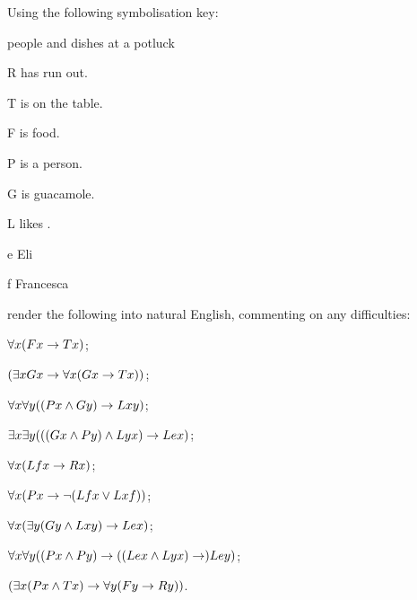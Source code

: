 \problempart
Using the following symbolisation key:
\begin{ekey}
\item[\domain] people and dishes at a potluck
\item[R]  has run out.
\item[T]  is on the table.
\item[F]  is food.
\item[P]  is a person.
\item[G]  is guacamole.
\item[L]  likes .
\item[e] Eli
\item[f] Francesca
\end{ekey}
render the following into natural English, commenting on any difficulties:
\begin{earg}
\item $\forall x (Fx \rightarrow Tx)$; %
\item $(\exists x Gx \rightarrow \forall x (Gx \rightarrow Tx))$; %
\item $\forall x \forall y ((Px \wedge Gy)\rightarrow Lxy)$; %
\item $\exists x \exists y (((Gx\wedge Py) \wedge Lyx) \rightarrow Lex)$; %
\item $\forall x(Lfx \rightarrow Rx) $; %
\item $\forall x (Px \to \neg (Lfx \vee Lxf))$; %
\item $\forall x (\exists y (Gy \wedge Lxy) \to Lex)$; %
\item $\forall x \forall y ((Px \wedge Py) \rightarrow ((Lex \wedge Lyx) \rightarrow) Ley)$; %
\item $(\exists x (Px \wedge Tx) \rightarrow \forall y (Fy \to Ry))$. %
\end{earg}


